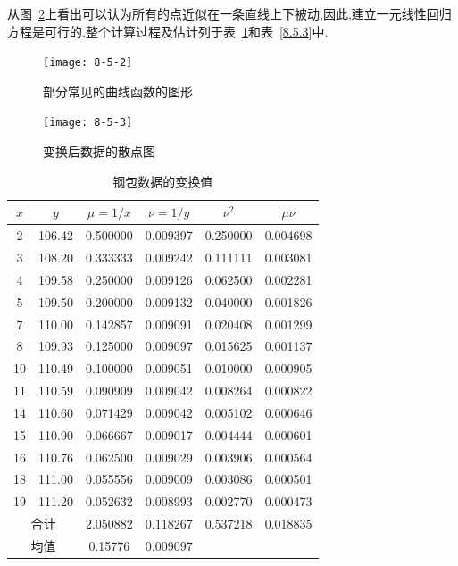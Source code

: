 从图~\ref{fig:8.5.3}上看出可以认为所有的点近似在一条直线上下被动,因此,建立一元线性回归方程是可行的.整个计算过程及估计列于表~\ref{tab:8.5.2}和表~\ref{8.5.3}中.
\begin{figure}[p]
	\centering
	\texttt{[image: 8-5-2]}
	\caption{部分常见的曲线函数的图形}
	\label{fig:8.5.2}
\end{figure}
\begin{figure}[htb]
	\centering
	\texttt{[image: 8-5-3]}
	\caption{变换后数据的散点图}
	\label{fig:8.5.3}
\end{figure}
\begin{table}[htbp]
	\centering
	\caption{钢包数据的变换值}
	\begin{tabular}{cccccc}
		\toprule
		$ x $      &  $ y $      &  $ \mu =1/x $  &  $ \nu =1/y $  &  $ \nu^2 $  &  $ \mu\nu $  \\\midrule
		2     & 106.42  & 0.500000  & 0.009397  & 0.250000  & 0.004698  \\
		3     & 108.20  & 0.333333  & 0.009242  & 0.111111  & 0.003081  \\
		4     & 109.58  & 0.250000  & 0.009126  & 0.062500  & 0.002281  \\
		5     & 109.50  & 0.200000  & 0.009132  & 0.040000  & 0.001826  \\
		7     & 110.00  & 0.142857  & 0.009091  & 0.020408  & 0.001299  \\
		8     & 109.93  & 0.125000  & 0.009097  & 0.015625  & 0.001137  \\
		10    & 110.49  & 0.100000  & 0.009051  & 0.010000  & 0.000905  \\
		11    & 110.59  & 0.090909  & 0.009042  & 0.008264  & 0.000822  \\
		14    & 110.60  & 0.071429  & 0.009042  & 0.005102  & 0.000646  \\
		15    & 110.90  & 0.066667  & 0.009017  & 0.004444  & 0.000601  \\
		16    & 110.76  & 0.062500  & 0.009029  & 0.003906  & 0.000564  \\
		18    & 111.00  & 0.055556  & 0.009009  & 0.003086  & 0.000501  \\
		19    & 111.20  & 0.052632  & 0.008993  & 0.002770  & 0.000473  \\
		\multicolumn{2}{c}{合计} & 2.050882  & 0.118267  & 0.537218  & 0.018835  \\
		\multicolumn{2}{c}{均值} & 0.15776 & 0.009097 &       &  \\\bottomrule
	\end{tabular}%
	\label{tab:8.5.2}%
\end{table}%

